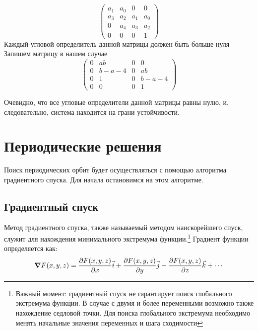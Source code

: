 \documentclass[12pt, a4paper]{article}
\begin{document}
\begin{equation}
    \label{gurwits}
    \begin{pmatrix}
        a_1 & a_0 & 0 & 0\\
        a_3 & a_2 & a_1 & a_0\\
        0 & a_4 & a_3 & a_2\\
        0 & 0 & 0 & 1
    \end{pmatrix}
\end{equation}
Каждый угловой определитель данной матрицы должен быть больше нуля\\
Запишем матрицу в нашем случае
\begin{equation*}
    \begin{pmatrix}
        0 & ab & 0 & 0\\
        0 & b - a - 4 & 0 & ab\\
        0 & 1 & 0 & b - a - 4\\
        0 & 0 & 0 & 1
    \end{pmatrix}
\end{equation*}

Очевидно, что все угловые определители данной матрицы равны нулю, и, следовательно, система находится на грани устойчивости.

\section{Периодические решения}

Поиск периодических орбит будет осуществляться с помощью алгоритма градиентного спуска. 
Для начала остановимся на этом алгоритме.

\subsection{Градиентный спуск}

 Метод градиентного спуска, также называемый методом наискорейшего спуск, служит для нахождения минимального экстремума функции.\footnote{Важный момент: градиентный спуск не гарантирует поиск глобального экстремума функции. В случае с двумя и более переменными возможно также нахождение седловой точки. Для поиска глобального экстремума необходимо менять начальные значения переменных и шага сходимости} 
 Градиент функции определяется как:
 \begin{equation*}
     \grad F(x, y, z) = \frac{\partial F(x, y, z)}{\partial x} \vec{i} + \frac{\partial F(x, y, z)}{\partial y} \vec{j}+ \frac{\partial F(x, y, z)}{\partial z} \vec{k} + \cdots
 \end{equation*}
\end{document}
